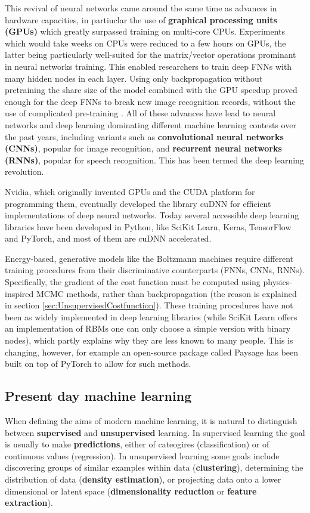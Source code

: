 \documentclass[twoside,english]{uiofysmaster}
\begin{document}
This revival of neural networks came around the same time as advances in hardware capacities, in partiuclar the use of \textbf{graphical processing units (GPUs)} which greatly surpassed training on multi-core CPUs. Experiments which would take weeks on CPUs were reduced to a few hours on GPUs, the latter being particularly well-suited for the matrix/vector operations prominant in neural networks training. This enabled researchers to train deep FNNs with many hidden nodes in each layer. Using only backpropagation without pretraining the share size of the model combined with the GPU speedup proved enough for the deep FNNs to break new image recognition records, without the use of complicated pre-training \cite{Ciresan2010}. All of these advances have lead to neural networks and deep learning dominating different machine learning contests over the past years, including variants such as \textbf{convolutional neural networks (CNNs)}, popular for image recognition, and \textbf{recurrent neural networks (RNNs)}, popular for speech recognition. This has been termed the deep learning revolution. 

Nvidia, which originally invented GPUs and the CUDA platform for programming them, eventually developed the library cuDNN for efficient implementations of deep neural networks. Today several accessible deep learning libraries have been developed in Python, like SciKit Learn, Keras, TensorFlow and PyTorch, and most of them are cuDNN accelerated. 

Energy-based, generative models like the Boltzmann machines require different training procedures from their discriminative counterparts (FNNs, CNNs, RNNs). Specifically, the gradient of the cost function must be computed using physics-inspired MCMC methods, rather than backpropagation (the reason is explained in section \ref{sec:UnsupervisedCostfunction}). These training procedures have not been as widely implemented in deep learning libraries (while SciKit Learn offers an implementation of RBMs one can only choose a simple version with binary nodes), which partly explains why they are less known to many people. This is changing, however, for example an open-source package called Paysage has been built on top of PyTorch to allow for such methods. 


\subsection{Present day machine learning}
When defining the aims of modern machine learning, it is natural to distinguish between \textbf{supervised} and \textbf{unsupervised} learning. In supervised learning the goal is usually to make \textbf{predictions}, either of cateogires (classification) or of continuous values (regression). In unsupervised learning some goals include discovering groups of similar examples within data (\textbf{clustering}), determining the distribution of data (\textbf{density estimation}), or projecting data onto a lower dimensional or latent space (\textbf{dimensionality reduction} or \textbf{feature extraction}). %
\end{document}
